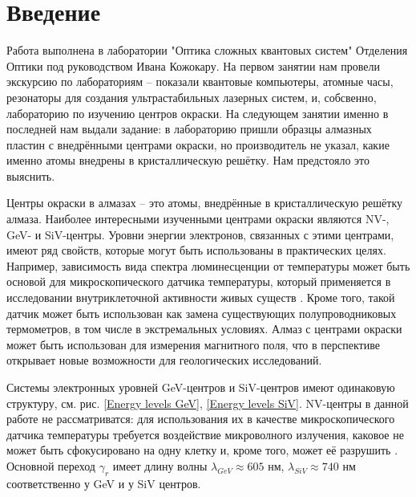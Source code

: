 \section{Введение}
Работа выполнена в лаборатории "Оптика сложных квантовых систем" Отделения Оптики
под руководством Ивана Кожокару. На первом занятии нам провели экскурсию по 
лабораториям -- показали квантовые компьютеры, атомные часы, резонаторы для
создания ультрастабильных лазерных систем, и,
собсвенно, лабораторию по изучению центров окраски. На следующем занятии 
именно в последней нам выдали задание: в лабораторию пришли образцы алмазных пластин
с внедрёнными центрами окраски, но производитель не указал, какие именно атомы 
внедрены в кристаллическую решётку. Нам предстояло это выяснить. 

Центры окраски в алмазах -- это атомы, внедрённые в кристаллическую решётку
алмаза. Наиболее интересными изученными центрами окраски являются NV-, GeV-
и SiV-центры. Уровни энергии электронов, связанных с этими центрами, имеют ряд
свойств, которые могут быть использованы в практических целях. Например, 
зависимость вида спектра люминесценции от температуры может быть основой для микроскопического
датчика температуры, который применяется в исследовании внутриклеточной активности
живых существ \cite{Therm}. Кроме того, такой датчик может быть использован
как замена существующих полупроводниковых термометров, в том числе в экстремальных
условиях. Алмаз с центрами окраски может быть использован для измерения магнитного
поля, что в перспективе открывает новые возможности для геологических исследований. 

Системы электронных уровней GeV-центров и SiV-центров имеют одинаковую структуру, см. рис.
\ref{Energy levels GeV}, \ref{Energy levels SiV}. NV-центры в данной работе не рассматриватся:
для использования их в качестве микроскопического датчика температуры требуется 
воздействие микроволного излучения, каковое не может быть сфокусировано на одну клетку и,
кроме того, может её разрушить \cite{Therm}. Основной переход $\gamma_r$ имеет 
длину волны $\lambda_{GeV} \approx 605 \text{ нм}$, $\lambda_{SiV} \approx 740 \text{ нм}$
соответственно у GeV и у SiV центров.

